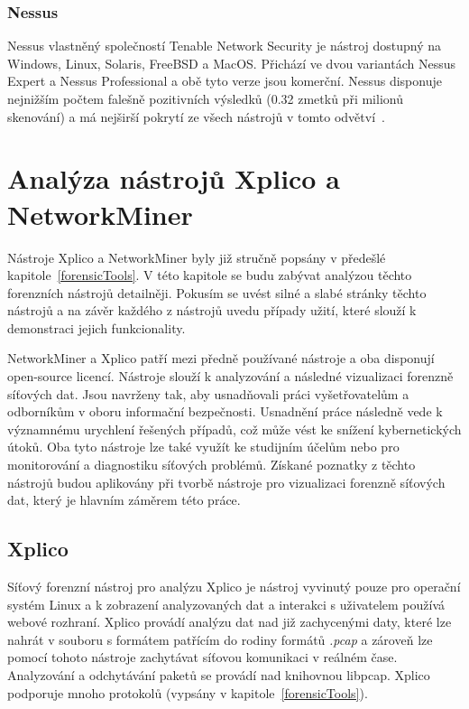             \subsubsection*{Nessus}
                Nessus vlastněný společností Tenable Network Security je nástroj dostupný na Windows, Linux, Solaris, FreeBSD a MacOS. Přichází ve dvou variantách Nessus Expert a Nessus Professional a obě tyto verze jsou komerční. Nessus disponuje nejnižším počtem falešně pozitivních výsledků (0.32 zmetků při milionů skenování) a má nejširší pokrytí ze všech nástrojů v tomto odvětví~\cite{NessusReference}.
        

\section{Analýza nástrojů Xplico a NetworkMiner}
\label{sec:XplicoNetworkMiner}

    Nástroje Xplico a NetworkMiner byly již stručně popsány v předešlé kapitole~\ref{forensicTools}. V této kapitole se budu zabývat analýzou těchto forenzních nástrojů detailněji. Pokusím se uvést silné a slabé stránky těchto nástrojů a na závěr každého z nástrojů uvedu případy užití, které slouží k demonstraci jejich funkcionality. 

    NetworkMiner a Xplico patří mezi předně používané nástroje a oba disponují open-source licencí. Nástroje slouží k analyzování a následné vizualizaci forenzně síťových dat. Jsou navrženy tak, aby usnadňovali práci vyšetřovatelům a odborníkům v oboru informační bezpečnosti. Usnadnění práce následně vede k významnému urychlení řešených případů, což může vést ke snížení kybernetických útoků. Oba tyto nástroje lze také využít ke studijním účelům nebo pro monitorování a diagnostiku síťových problémů. Získané poznatky z těchto nástrojů budou aplikovány při tvorbě nástroje pro vizualizaci forenzně síťových dat, který je hlavním záměrem této práce. 

    
    \subsection{Xplico}
        Síťový forenzní nástroj pro analýzu Xplico je nástroj vyvinutý pouze pro operační systém Linux a k zobrazení analyzovaných dat a interakci s uživatelem používá webové rozhraní. Xplico provádí analýzu dat nad již zachycenými daty, které lze nahrát v souboru s formátem patřícím do rodiny formátů \textit{.pcap} a zároveň lze pomocí tohoto nástroje zachytávat síťovou komunikaci v reálném čase. Analyzování a odchytávání paketů se provádí nad knihovnou libpcap. Xplico podporuje mnoho protokolů (vypsány v kapitole~\ref{forensicTools}).
        
